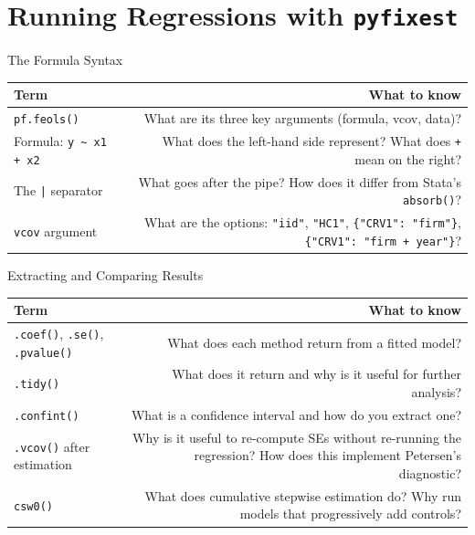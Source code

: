 \documentclass[9pt,aspectratio=169]{beamer}
\begin{document}
\section{Running Regressions with \texttt{pyfixest}}

\begin{frame}{The Formula Syntax}

\begin{tabular}{@{}lR@{}}
\toprule
\textbf{Term} & \textbf{What to know} \\
\midrule
\alert{\texttt{pf.feols()}} & What are its three key arguments (formula, vcov, data)? \\[0.8em]
\alert{Formula: \texttt{y \textasciitilde{} x1 + x2}} & What does the left-hand side represent? What does \texttt{+} mean on the right? \\[0.8em]
\alert{The \texttt{|} separator} & What goes after the pipe? How does it differ from Stata's \texttt{absorb()}? \\[0.8em]
\alert{\texttt{vcov} argument} & What are the options: \texttt{"iid"}, \texttt{"HC1"}, \texttt{\{"CRV1": "firm"\}}, \texttt{\{"CRV1": "firm + year"\}}? \\
\bottomrule
\end{tabular}

\end{frame}


\begin{frame}{Extracting and Comparing Results}

\begin{tabular}{@{}lR@{}}
\toprule
\textbf{Term} & \textbf{What to know} \\
\midrule
\alert{\texttt{.coef()}, \texttt{.se()}, \texttt{.pvalue()}} & What does each method return from a fitted model? \\[0.8em]
\alert{\texttt{.tidy()}} & What does it return and why is it useful for further analysis? \\[0.8em]
\alert{\texttt{.confint()}} & What is a confidence interval and how do you extract one? \\[0.8em]
\alert{\texttt{.vcov()} after estimation} & Why is it useful to re-compute SEs without re-running the regression? How does this implement Petersen's diagnostic? \\[0.8em]
\alert{\texttt{csw0()}} & What does cumulative stepwise estimation do? Why run models that progressively add controls? \\
\bottomrule
\end{tabular}

\end{frame}
\end{document}
